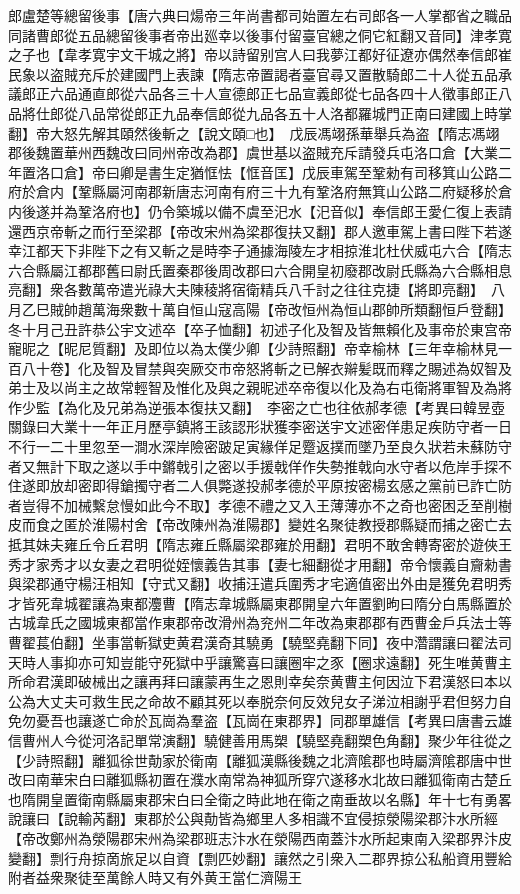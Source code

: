 郎盧楚等總留後事【唐六典曰煬帝三年尚書都司始置左右司郎各一人掌都省之職品同諸曹郎從五品總留後事者帝出廵幸以後事付留臺官總之侗它紅翻又音同】津孝寛之子也【韋孝寛宇文干城之將】帝以詩留别宫人曰我夢江都好征遼亦偶然奉信郎崔民象以盗賊充斥於建國門上表諫【隋志帝置謁者臺官尋又置散騎郎二十人從五品承議郎正六品通直郎從六品各三十人宣德郎正七品宣義郎從七品各四十人徵事郎正八品將仕郎從八品常從郎正九品奉信郎從九品各五十人洛都羅城門正南曰建國上時掌翻】帝大怒先解其頤然後斬之【說文頤□也】　戊辰馮翊孫華舉兵為盗【隋志馮翊郡後魏置華州西魏改曰同州帝改為郡】虞世基以盗賊充斥請發兵屯洛口倉【大業二年置洛口倉】帝曰卿是書生定猶恇怯【恇音匡】戊辰車駕至鞏勑有司移箕山公路二府於倉内【鞏縣屬河南郡新唐志河南有府三十九有鞏洛府無箕山公路二府疑移於倉内後遂并為鞏洛府也】仍令築城以備不虞至汜水【汜音似】奉信郎王愛仁復上表請還西京帝斬之而行至梁郡【帝改宋州為梁郡復扶又翻】郡人邀車駕上書曰陛下若遂幸江都天下非陛下之有又斬之是時李子通據海陵左才相掠淮北杜伏威屯六合【隋志六合縣屬江都郡舊曰尉氏置秦郡後周改郡曰六合開皇初廢郡改尉氏縣為六合縣相息亮翻】衆各數萬帝遣光祿大夫陳稜將宿衛精兵八千討之往往克捷【將即亮翻】　八月乙巳賊帥趙萬海衆數十萬自恒山寇高陽【帝改恒州為恒山郡帥所類翻恒戶登翻】　冬十月己丑許恭公宇文述卒【卒子恤翻】初述子化及智及皆無賴化及事帝於東宫帝寵昵之【昵尼質翻】及即位以為太僕少卿【少詩照翻】帝幸榆林【三年幸榆林見一百八十卷】化及智及冒禁與突厥交市帝怒將斬之已解衣辮髪既而釋之賜述為奴智及弟士及以尚主之故常輕智及惟化及與之親昵述卒帝復以化及為右屯衛將軍智及為將作少監【為化及兄弟為逆張本復扶又翻】　李密之亡也往依郝孝德【考異曰韓昱壺關錄曰大業十一年正月歷亭鎮將王該認形狀獲李密送宇文述密佯患足疾防守者一日不行一二十里忽至一澗水深岸險密跛足寅緣佯足蹷返撲而墜乃至良久狀若未蘇防守者又無計下取之遂以手中鏘戟引之密以手援戟佯作失勢推戟向水守者以危岸手探不住遂即放却密即得鎗擉守者二人俱斃遂投郝孝德於平原按密楊玄感之黨前已詐亡防者豈得不加械繫怠慢如此今不取】孝德不禮之又入王薄薄亦不之奇也密困乏至削樹皮而食之匿於淮陽村舍【帝改陳州為淮陽郡】變姓名聚徒教授郡縣疑而捕之密亡去抵其妹夫雍丘令丘君明【隋志雍丘縣屬梁郡雍於用翻】君明不敢舍轉寄密於遊俠王秀才家秀才以女妻之君明從姪懷義告其事【妻七細翻從才用翻】帝令懷義自齎勑書與梁郡通守楊汪相知【守式又翻】收捕汪遣兵圍秀才宅適值密出外由是獲免君明秀才皆死韋城翟讓為東都灋曹【隋志韋城縣屬東郡開皇六年置劉昫曰隋分白馬縣置於古城韋氏之國城東都當作東郡帝改滑州為兖州二年改為東郡郡有西曹金戶兵法士等曹翟萇伯翻】坐事當斬獄吏黄君漢奇其驍勇【驍堅堯翻下同】夜中濳謂讓曰翟法司天時人事抑亦可知豈能守死獄中乎讓驚喜曰讓圈牢之豕【圈求遠翻】死生唯黄曹主所命君漢即破械出之讓再拜曰讓蒙再生之恩則幸矣奈黄曹主何因泣下君漢怒曰本以公為大丈夫可救生民之命故不顧其死以奉脱奈何反效兒女子涕泣相謝乎君但努力自免勿憂吾也讓遂亡命於瓦崗為羣盗【瓦崗在東郡界】同郡單雄信【考異曰唐書云雄信曹州人今從河洛記單常演翻】驍健善用馬槊【驍堅堯翻槊色角翻】聚少年往從之【少詩照翻】離狐徐世勣家於衛南【離狐漢縣後魏之北濟隂郡也時屬濟隂郡唐中世改曰南華宋白曰離狐縣初置在濮水南常為神狐所穿穴遂移水北故曰離狐衛南古楚丘也隋開皇置衛南縣屬東郡宋白曰全衛之時此地在衛之南垂故以名縣】年十七有勇畧說讓曰【說輸芮翻】東郡於公與勣皆為鄉里人多相識不宜侵掠滎陽梁郡汴水所經【帝改鄭州為滎陽郡宋州為梁郡班志汴水在滎陽西南蓋汴水所起東南入梁郡界汴皮變翻】剽行舟掠啇旅足以自資【剽匹妙翻】讓然之引衆入二郡界掠公私船資用豐給附者益衆聚徒至萬餘人時又有外黄王當仁濟陽王